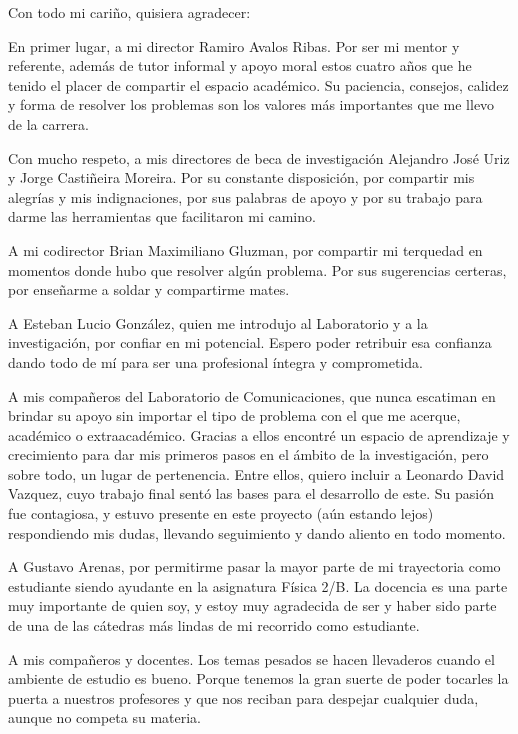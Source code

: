 \justifying

Con todo mi cariño, quisiera agradecer: 

En primer lugar, a mi director Ramiro Avalos Ribas. Por ser mi mentor y referente, además de tutor informal y apoyo moral estos cuatro años que he tenido el placer de compartir el espacio académico. Su paciencia, consejos, calidez y forma de resolver los problemas son los valores más importantes que me llevo de la carrera. 

Con mucho respeto, a mis directores de beca de investigación Alejandro José Uriz y Jorge Castiñeira Moreira. Por su constante disposición, por compartir mis alegrías y mis indignaciones, por sus palabras de apoyo y por su trabajo para darme las herramientas que facilitaron mi camino.    

A mi codirector Brian Maximiliano Gluzman, por compartir mi terquedad en momentos donde hubo que resolver algún problema. Por sus sugerencias certeras, por enseñarme a soldar y compartirme mates.  

A Esteban Lucio González, quien me introdujo al Laboratorio y a la investigación, por confiar en mi potencial. Espero poder retribuir esa confianza dando todo de mí para ser una profesional íntegra y comprometida. 

A mis compañeros del Laboratorio de Comunicaciones, que nunca escatiman en brindar su apoyo sin importar el tipo de problema con el que me acerque, académico o extraacadémico. Gracias a ellos encontré un espacio de aprendizaje y crecimiento para dar mis primeros pasos en el ámbito de la investigación, pero sobre todo, un lugar de pertenencia. Entre ellos, quiero incluir a Leonardo David Vazquez, cuyo trabajo final sentó las bases para el desarrollo de este. Su pasión fue contagiosa, y estuvo presente en este proyecto (aún estando lejos) respondiendo mis dudas, llevando seguimiento y dando aliento en todo momento. 

A Gustavo Arenas, por permitirme pasar la mayor parte de mi trayectoria como estudiante siendo ayudante en la asignatura  Física 2/B. La docencia es una parte muy importante de quien soy, y estoy muy agradecida de ser y haber sido parte de una de las cátedras más lindas de mi recorrido como estudiante. 

A mis compañeros y docentes. Los temas pesados se hacen llevaderos cuando el ambiente de estudio es bueno. Porque tenemos la gran suerte de poder tocarles la puerta a nuestros profesores y que nos reciban para despejar cualquier duda, aunque no competa su materia.

